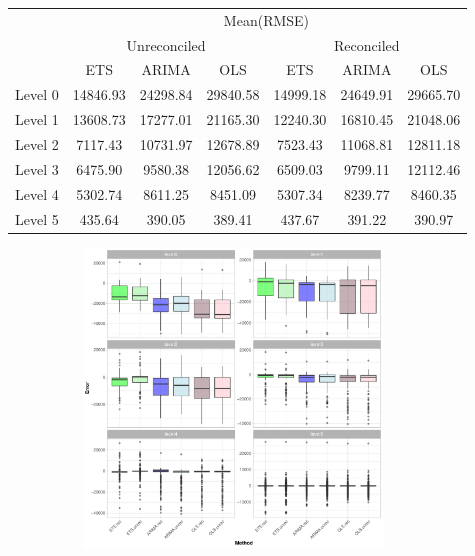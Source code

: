 \documentclass[11pt,a4paper,]{article}
\let\origfigure\figure
\let\endorigfigure\endfigure
\renewenvironment{figure}[1][2] {
    \expandafter\origfigure\expandafter[htbp]
} {
    \endorigfigure
}
\let\origtable\table
\let\endorigtable\endtable
\renewenvironment{table}[1][2] {
    \expandafter\origtable\expandafter[htbp]
} {
    \endorigtable
}
\begin{document}
\begin{table}[t]

\caption{\label{tab:wikipediadataresultRMSE}Mean(RMSE) for ETS, ARIMA and OLS with and without reconciliation - 28-step-ahead - Wikipedia dataset}
\centering
\begin{tabular}{ccccccc}
\toprule
\multicolumn{1}{c}{} & \multicolumn{6}{c}{Mean(RMSE)} \\
\cmidrule(l{3pt}r{3pt}){2-7}
\multicolumn{1}{c}{} & \multicolumn{3}{c}{Unreconciled} & \multicolumn{3}{c}{Reconciled} \\
\cmidrule(l{3pt}r{3pt}){2-4} \cmidrule(l{3pt}r{3pt}){5-7}
 & ETS & ARIMA & OLS & ETS & ARIMA & OLS\\
\midrule
Level 0 & 14846.93 & 24298.84 & 29840.58 & 14999.18 & 24649.91 & 29665.70\\
Level 1 & 13608.73 & 17277.01 & 21165.30 & 12240.30 & 16810.45 & 21048.06\\
Level 2 & 7117.43 & 10731.97 & 12678.89 & 7523.43 & 11068.81 & 12811.18\\
Level 3 & 6475.90 & 9580.38 & 12056.62 & 6509.03 & 9799.11 & 12112.46\\
Level 4 & 5302.74 & 8611.25 & 8451.09 & 5307.34 & 8239.77 & 8460.35\\
Level 5 & 435.64 & 390.05 & 389.41 & 437.67 & 391.22 & 390.97\\
\bottomrule
\end{tabular}
\end{table}

\begin{figure}

{\centering \includegraphics[width=450px,height=300px]{Paper-Figures/results_Wikipedia/boxplot_28} 

}

\caption{Box plot for forecast errors -  Reconciled and unreconciled ETS, ARIMA and OLS in each hierarchy level for 28-step-ahead Wikipedia pageviews}\label{fig:boxplotwiki}
\end{figure}
\end{document}
